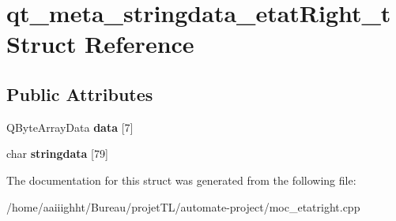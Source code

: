 \hypertarget{structqt__meta__stringdata__etat_right__t}{\section{qt\-\_\-meta\-\_\-stringdata\-\_\-etat\-Right\-\_\-t Struct Reference}
\label{structqt__meta__stringdata__etat_right__t}
}
\subsection*{Public Attributes}
\begin{DoxyCompactItemize}
\item 
\hypertarget{structqt__meta__stringdata__etat_right__t_a3df3a504f319e535d278c0520a3365a5}{Q\-Byte\-Array\-Data {\bfseries data} \mbox{[}7\mbox{]}}\label{structqt__meta__stringdata__etat_right__t_a3df3a504f319e535d278c0520a3365a5}

\item 
\hypertarget{structqt__meta__stringdata__etat_right__t_abb73320c6aab80e726ee5fcf933bc1fb}{char {\bfseries stringdata} \mbox{[}79\mbox{]}}\label{structqt__meta__stringdata__etat_right__t_abb73320c6aab80e726ee5fcf933bc1fb}

\end{DoxyCompactItemize}


The documentation for this struct was generated from the following file\-:\begin{DoxyCompactItemize}
\item 
/home/aaiiighht/\-Bureau/projet\-T\-L/automate-\/project/moc\-\_\-etatright.\-cpp\end{DoxyCompactItemize}
